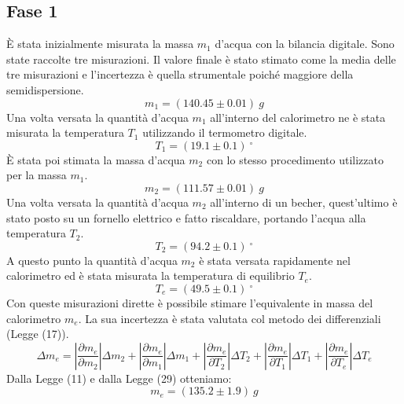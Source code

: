 \subsection{Fase 1}
È stata inizialmente misurata la massa $m_1$ d'acqua con la bilancia digitale. Sono state raccolte tre misurazioni. Il valore finale è stato stimato come la media delle tre misurazioni e l'incertezza è quella strumentale poiché maggiore della semidispersione.
\begin{equation}
	m_1=(140.45\pm 0.01)\ g
\end{equation}
Una volta versata la quantità d'acqua $m_1$ all'interno del calorimetro ne è stata misurata la temperatura $T_1$ utilizzando il termometro digitale.
\begin{equation}
	T_1=(19.1\pm 0.1)\ ^{\circ}
\end{equation}
È stata poi stimata la massa d'acqua $m_2$ con lo stesso procedimento utilizzato per la massa $m_1$.
\begin{equation}
	m_2=(111.57\pm 0.01)\ g
\end{equation}
Una volta versata la quantità d'acqua $m_2$ all'interno di un becher, quest'ultimo è stato posto su un fornello elettrico e fatto riscaldare, portando l'acqua alla temperatura $T_2$.
\begin{equation}
	T_2=(94.2\pm 0.1)\ ^{\circ}
\end{equation}
A questo punto la quantità d'acqua $m_2$ è stata versata rapidamente nel calorimetro ed è stata misurata la temperatura di equilibrio $T_e$.
\begin{equation}
	T_e=(49.5\pm 0.1)\ ^{\circ}
\end{equation}
Con queste misurazioni dirette è possibile stimare l'equivalente in massa del calorimetro $m_e$. La sua incertezza è stata valutata col metodo dei differenziali (Legge (17)).
\begin{equation}
	\Delta m_e=\left|\frac{\partial m_e}{\partial m_2} \right|\Delta m_2+\left|\frac{\partial m_e}{\partial m_1} \right|\Delta m_1 + \left|\frac{\partial m_e}{\partial T_2} \right|\Delta T_2 + \left|\frac{\partial m_e}{\partial T_1} \right|\Delta T_1 + \left|\frac{\partial m_e}{\partial T_e} \right|\Delta T_e
\end{equation}
Dalla Legge (11) e dalla Legge (29) otteniamo:
\begin{equation}
	m_e=(135.2\pm 1.9)\ g
\end{equation}



